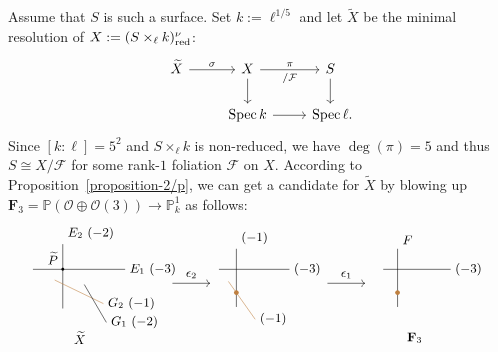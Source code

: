 \documentclass[reqno,oneside]{amsart}
\theoremstyle{definition}
\theoremstyle{plain}
\numberwithin{equation}{section}
\newcommand\Spec{\operatorname{Spec}}
\begin{document}
Assume that $S$ is such a surface. Set $k:=\ell^{1/5}$ and let $\widetilde X$ be the minimal resolution of $X:=(S \times_\ell k)_{\rm red}^\nu$:
\[
  \begin{tikzcd}
    \widetilde X \rar{\sigma} &
    X \dar\ar[r,"\pi", "/\mathcal F"'] & S\dar \\
                                       &\Spec k \rar & \Spec\ell \rlap{.}
  \end{tikzcd}
\]
Since $[k:\ell]=5^2$ and $S \times_\ell k$ is non-reduced, we have $\deg(\pi) = 5$ and thus $S \cong X/\mathcal F$ for some rank-$1$ foliation $\mathcal F$ on $X$.
According to Proposition~\ref{proposition-2/p}, we can get a candidate for $\widetilde X$ by blowing up $\mathbf F_3=\mathbb P(\mathcal O\oplus\mathcal O(3))\to\mathbb P^1_k$ as follows:
\begin{equation}\label{eq-blow-up}
  \begin{tikzpicture}[baseline=(current bounding box.center),scale=.78,
      every node/.style={font=\small},line cap=round,line join=round]
    \begin{scope}[xshift=0cm]
      \draw (-1.5,.55)--(1.45,.55) node[right] {$E_1\ (-3)$};
      \draw (-.55,-.7)--(-.55,1.35) node[above right] {$E_2\ (-2)$};
      \draw[brown] (-.8,.2)--(.75,-.55)
        node[right,text=black] {$G_2\ (-1)$};
      \draw (.15,.05)--(.85,-1.15)
        node[right] {$G_1\ (-2)$};
      \fill[black] (-.55,.55) circle (1.35pt);
      \node[above left] at (-.55,.55) {$\widetilde P$};
      \node at (0,-1.65) {$\widetilde X$};
    \end{scope}

    \draw[->] (3,.1)--(4.2,.1) node[midway,above] {$\epsilon_2$};

    \begin{scope}[xshift=5.6cm]
      \draw (-1.1,.55)--(1.15,.55) node[right] {$(-3)$};
      \draw (-.55,-.65)--(-.55,1.2) node[above right] {$(-1)$};
      \draw[brown] (-.8,.15)--(.05,-1.05)
        node[right,text=black] {$(-1)$};
      \fill[brown] (-.55,-.2) circle (2.2pt);
    \end{scope}

    \draw[->] (8,.1)--(9.2,.1) node[midway,above] {$\epsilon_1$};

    \begin{scope}[xshift=10.8cm]
      \draw (-1,.55)--(1.15,.55) node[right] {$(-3)$};
      \draw (-.55,-.65)--(-.55,1.2) node[above right] {$F$};
      \fill[brown] (-.55,-.2) circle (2.2pt);
      \node at (0,-1.65) {$\mathbf F_3$};
    \end{scope}
  \end{tikzpicture}
\end{equation}
\end{document}
